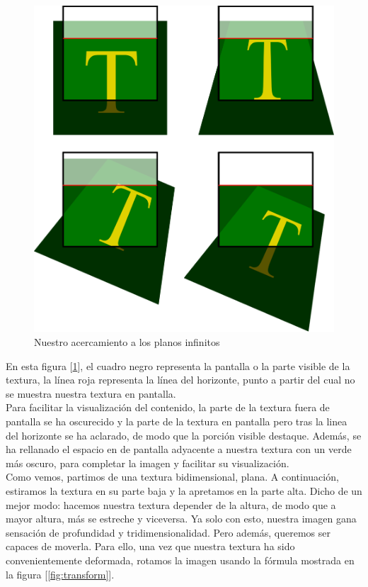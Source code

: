 \begin{figure}[h]
	\centering
	\includegraphics[width=12cm]{archivos/planes}
	\caption{Nuestro acercamiento a los planos infinitos}
	\label{fig:planes}
\end{figure}

En esta figura [\ref{fig:planes}], el cuadro negro representa la pantalla o la parte visible de la textura, la línea roja representa la línea del horizonte, punto a partir del cual no se muestra nuestra textura en pantalla.\\

Para facilitar la visualización del contenido, la parte de la textura fuera de pantalla se ha oscurecido y la parte de la textura en pantalla pero tras la linea del horizonte se ha aclarado, de modo que la porción visible destaque. Además, se ha rellanado el espacio en de pantalla adyacente a nuestra textura con un verde más oscuro, para completar la imagen y facilitar su visualización.\\

Como vemos, partimos de una textura bidimensional, plana. A continuación, estiramos la textura en su parte baja y la apretamos en la parte alta. Dicho de un mejor modo: hacemos nuestra textura depender de la altura, de modo que a mayor altura, más se estreche y viceversa. Ya solo con esto, nuestra imagen gana sensación de profundidad y tridimensionalidad. Pero además, queremos ser capaces de moverla. Para ello, una vez que nuestra textura ha sido convenientemente deformada, rotamos la imagen usando la fórmula mostrada en la figura [\ref{fig:transform}].\\


